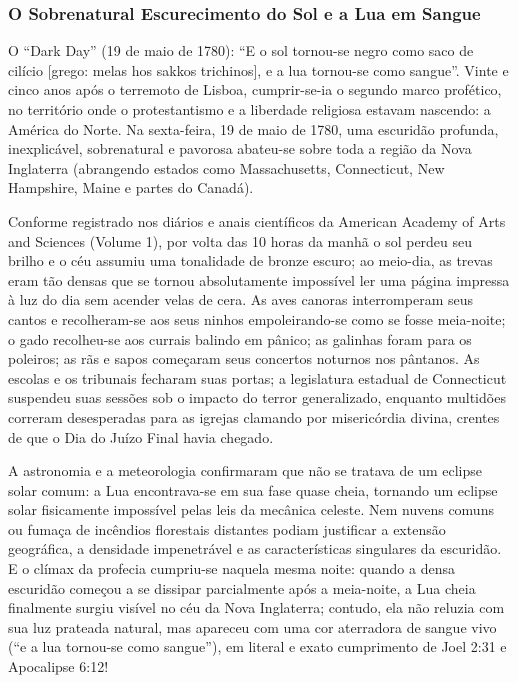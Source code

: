 \subsubsection*{O Sobrenatural Escurecimento do Sol e a Lua em Sangue}
O ``Dark Day'' (19 de maio de 1780):
``E o sol tornou-se negro como saco de cilício [grego: melas hos sakkos trichinos], e a lua tornou-se como sangue''.
Vinte e cinco anos após o terremoto de Lisboa, cumprir-se-ia o segundo marco profético, no território onde o protestantismo e a liberdade religiosa estavam nascendo: a América do Norte.
Na sexta-feira, 19 de maio de 1780, uma escuridão profunda, inexplicável, sobrenatural e pavorosa abateu-se sobre toda a região da Nova Inglaterra (abrangendo estados como Massachusetts, Connecticut, New Hampshire, Maine e partes do Canadá).

Conforme registrado nos diários e anais científicos da American Academy of Arts and Sciences (Volume 1), por volta das 10 horas da manhã o sol perdeu seu brilho e o céu assumiu uma tonalidade de bronze escuro; ao meio-dia, as trevas eram tão densas que se tornou absolutamente impossível ler uma página impressa à luz do dia sem acender velas de cera. As aves canoras interromperam seus cantos e recolheram-se aos seus ninhos empoleirando-se como se fosse meia-noite; o gado recolheu-se aos currais balindo em pânico; as galinhas foram para os poleiros; as rãs e sapos começaram seus concertos noturnos nos pântanos. As escolas e os tribunais fecharam suas portas; a legislatura estadual de Connecticut suspendeu suas sessões sob o impacto do terror generalizado, enquanto multidões correram desesperadas para as igrejas clamando por misericórdia divina, crentes de que o Dia do Juízo Final havia chegado.

A astronomia e a meteorologia confirmaram que não se tratava de um eclipse solar comum: a Lua encontrava-se em sua fase quase cheia, tornando um eclipse solar fisicamente impossível pelas leis da mecânica celeste. Nem nuvens comuns ou fumaça de incêndios florestais distantes podiam justificar a extensão geográfica, a densidade impenetrável e as características singulares da escuridão.
E o clímax da profecia cumpriu-se naquela mesma noite: quando a densa escuridão começou a se dissipar parcialmente após a meia-noite, a Lua cheia finalmente surgiu visível no céu da Nova Inglaterra; contudo, ela não reluzia com sua luz prateada natural, mas apareceu com uma cor aterradora de sangue vivo (``e a lua tornou-se como sangue''), em literal e exato cumprimento de Joel 2:31 e Apocalipse 6:12!


